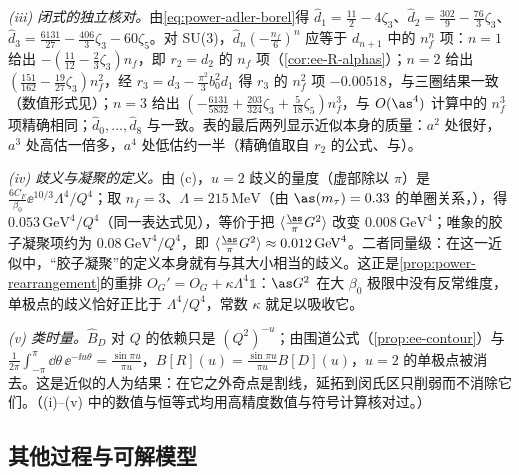 \begin{example}[带 $n$ 个费米子泡的单胶子]
\emph{(iii) 闭式的独立核对。}由\eqref{eq:power-adler-borel}得 $\hat d_1=\frac{11}{2}-4\zeta_3$、$\hat d_2=\frac{302}{9}-\frac{76}{3}\zeta_3$、$\hat d_3=\frac{6131}{27}-\frac{406}{3}\zeta_3-60\zeta_5$。对 SU(3)，$\hat d_n(-\frac{n_f}6)^n$ 应等于 $d_{n+1}$ 中的 $n_f^n$ 项：$n=1$ 给出 $-(\frac{11}{12}-\frac23\zeta_3)n_f$，即 $r_2=d_2$ 的 $n_f$ 项（\cref{cor:ee-R-alphas}）；$n=2$ 给出 $(\frac{151}{162}-\frac{19}{27}\zeta_3)n_f^2$，经 $r_3=d_3-\frac{\pi^2}{3}b_0^2d_1$ 得 $r_3$ 的 $n_f^2$ 项 $-0.00518$，与三圈结果\cite{GorishniiKataevLarin1991,SurguladzeSamuel1991}一致（数值形式见\cite[式~(5)]{BaikovChetyrkinKuhn2008}）；$n=3$ 给出 $(-\frac{6131}{5832}+\frac{203}{324}\zeta_3+\frac5{18}\zeta_5)n_f^3$，与 $O(\as^4)$ 计算中的 $n_f^3$ 项\cite[式~(4)]{BaikovChetyrkinKuhn2008}精确相同；$\hat d_0,\dots,\hat d_8$ 与\cite[表~4]{Beneke1999}一致。表的最后两列显示近似本身的质量：$a^2$ 处很好，$a^3$ 处高估一倍多，$a^4$ 处低估约一半（精确值取自 $r_2$ 的公式、\cite[表~4]{Beneke1999}与\cite[式~(8)]{BaikovChetyrkinKuhn2008}）。

\emph{(iv) 歧义与凝聚的定义。}由 (c)，$u=2$ 歧义的量度（虚部除以 $\pi$）是 $\frac{6C_F}{\beta_0}\ee^{10/3}\Lambda^4/Q^4$；取 $n_f=3$、$\Lambda=215\,\mathrm{MeV}$（由 $\as(m_\tau)=0.33$ 的单圈关系，\cite[脚注~42]{Beneke1999}），得 $0.053\,\mathrm{GeV}^4/Q^4$（同一表达式见\cite[式~(5.12)]{Beneke1999}），等价于把 $\langle\frac{\as}{\pi}G^2\rangle$ 改变 $0.008\,\mathrm{GeV}^4$；唯象的胶子凝聚项约为 $0.08\,\mathrm{GeV}^4/Q^4$\cite[式~(5.13)]{Beneke1999}，即 $\langle\frac{\as}{\pi}G^2\rangle\approx0.012\,\mathrm{GeV}^4$。二者同量级：在这一近似中，“胶子凝聚”的定义本身就有与其大小相当的歧义。这正是\cref{prop:power-rearrangement}的重排 $O_G'=O_G+\kappa\Lambda^4\mathbb 1$：$\as G^2$ 在大 $\beta_0$ 极限中没有反常维度，单极点的歧义恰好正比于 $\Lambda^4/Q^4$，常数 $\kappa$ 就足以吸收它。

\emph{(v) 类时量。}$\hat B_D$ 对 $Q$ 的依赖只是 $(Q^2)^{-u}$；由围道公式（\cref{prop:ee-contour}）与 $\frac1{2\pi}\int_{-\pi}^{\pi}\dd\theta\,\ee^{-\ii u\theta}=\frac{\sin\pi u}{\pi u}$，$B[R](u)=\frac{\sin\pi u}{\pi u}B[D](u)$\cite[式~(5.15)]{Beneke1999}，$u=2$ 的单极点被消去。这是近似的人为结果：在它之外奇点是割线，延拓到闵氏区只削弱而不消除它们\cite[第~5.2.1~节]{Beneke1999}。（(i)--(v) 中的数值与恒等式均用高精度数值与符号计算核对过。）
\end{example}

\subsection{其他过程与可解模型}

